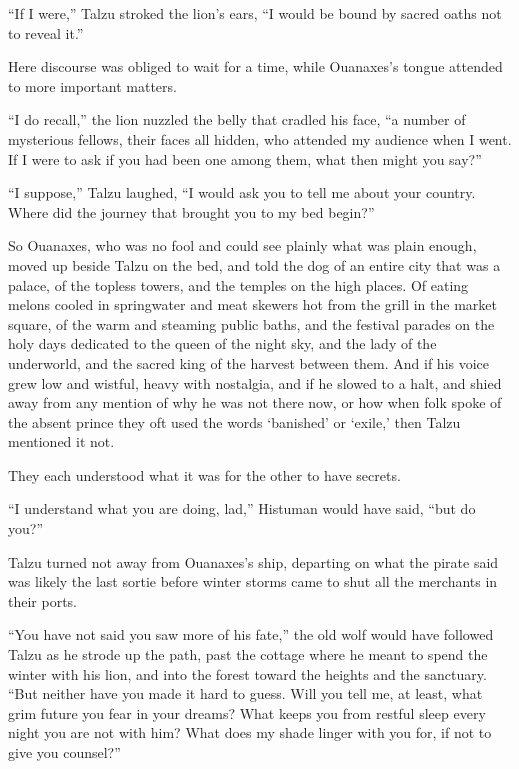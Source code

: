 ``If I were,'' Talzu stroked the lion's ears, ``I would be bound by sacred oaths not to reveal it.''

Here discourse was obliged to wait for a time, while Ouanaxes's tongue attended to more important matters.

``I do recall,'' the lion nuzzled the belly that cradled his face, ``a number of mysterious fellows, their faces all hidden, who attended my audience when I went. If I were to ask if you had been one among them, what then might you say?''

``I suppose,'' Talzu laughed, ``I would ask you to tell me about your country. Where did the journey that brought you to my bed begin?''

So Ouanaxes, who was no fool and could see plainly what was plain enough, moved up beside Talzu on the bed, and told the dog of an entire city that was a palace, of the topless towers, and the temples on the high places. Of eating melons cooled in springwater and meat skewers hot from the grill in the market square, of the warm and steaming public baths, and the festival parades on the holy days dedicated to the queen of the night sky, and the lady of the underworld, and the sacred king of the harvest between them. And if his voice grew low and wistful, heavy with nostalgia, and if he slowed to a halt, and shied away from any mention of why he was not there now, or how when folk spoke of the absent prince they oft used the words `banished' or `exile,' then Talzu mentioned it not.

They each understood what it was for the other to have secrets.

\secdiv

\noindent ``I understand what you are doing, lad,'' Histuman would have said, ``but do you?''

Talzu turned not away from Ouanaxes's ship, departing on what the pirate said was likely the last sortie before winter storms came to shut all the merchants in their ports.

``You have not said you saw more of his fate,'' the old wolf would have followed Talzu as he strode up the path, past the cottage where he meant to spend the winter with his lion, and into the forest toward the heights and the sanctuary. ``But neither have you made it hard to guess. Will you tell me, at least, what grim future you fear in your dreams? What keeps you from restful sleep every night you are not with him? What does my shade linger with you for, if not to give you counsel?''

